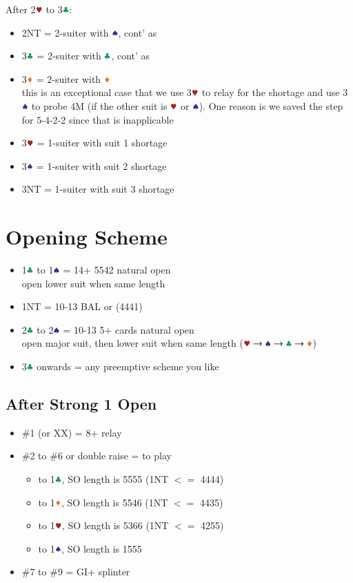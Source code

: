 \documentclass{article}
\begin{document}
\begin{multicols}{2}
\noindent After 2$\hhh$ to 3$\ccc$:
\begin{itemize}
    \item 2NT = 2-suiter with $\sss$, cont' as 
    \item 3$\ccc$ = 2-suiter with $\ccc$, cont' as 
    \item 3$\ddd$ = 2-suiter with $\ddd$ \\
        this is an exceptional case that we use 3$\hhh$ to relay for the shortage and use 3$\sss$ to probe 4M (if the other suit is $\hhh$ or $\sss$). One reason is we saved the step for 5-4-2-2 since that is inapplicable
    \item 3$\hhh$ = 1-suiter with suit 1 shortage
    \item 3$\sss$ = 1-suiter with suit 2 shortage
    \item 3NT = 1-suiter with suit 3 shortage
\end{itemize}

\section{Opening Scheme}
\begin{itemize}
    \item 1$\ccc$ to 1$\sss$ = 14+ 5542 natural open \\
        open lower suit when same length
    \item 1NT = 10-13 BAL or (4441)
    \item 2$\ccc$ to 2$\sss$ = 10-13 5+ cards natural open \\
        open major suit, then lower suit when same length
        ($\hhh \rightarrow \sss \rightarrow \ccc \rightarrow \ddd$)
    \item 3$\ccc$ onwards = any preemptive scheme you like
\end{itemize}

\subsection{After Strong 1 Open}
\begin{itemize}
    \item \#1 (or XX) = 8+ relay
    \item \#2 to \#6 or double raise = to play
    \begin{itemize}
        \item to 1$\ccc$, SO length is 5555 (1NT $<=$ 4444)
        \item to 1$\ddd$, SO length is 5546 (1NT $<=$ 4435)
        \item to 1$\hhh$, SO length is 5366 (1NT $<=$ 4255)
        \item to 1$\sss$, SO length is 1555
    \end{itemize}
    \item \#7 to \#9 = GI+ splinter
\end{itemize}


\end{multicols}
\end{document}
